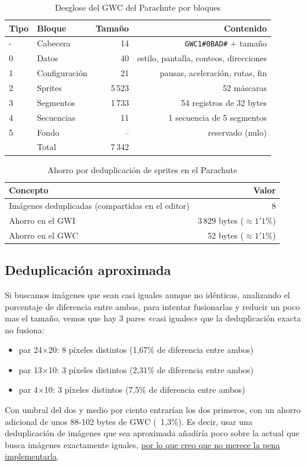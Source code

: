 \begin{table}[H]
	\centering
	\begin{tabular}{llrr}
		\toprule
		Tipo & Bloque & Tamaño & Contenido \\
		\midrule
		- & Cabecera & 14 & \texttt{GWC1\#0BAD\#} + tamaño \\
		0 & Datos & 40 & estilo, pantalla, conteos, direcciones \\
		1 & Configuración & 21 & pausas, aceleración, rutas, fin \\
		2 & Sprites & 5\,523 & 52 máscaras \\
		3 & Segmentos & 1\,733 & 54 registros de 32 bytes \\
		4 & Secuencias & 11 & 1 secuencia de 5 segmentos \\
		5 & Fondo & -- & reservado (nulo) \\
		\midrule
		&Total & 7\,342 & \\
		\bottomrule
	\end{tabular}
	\caption{Desglose del GWC del Parachute por bloques}
	\label{tab:F5I7BloquesParachute}
\end{table}

\begin{table}[H]
	\centering
	\begin{tabular}{lr}
		\toprule
		Concepto & Valor \\
		\midrule
		Imágenes deduplicadas (compartidas en el editor) & 8 \\
		Ahorro en el GWI & 3\,829 bytes ($\approx 1'1\%$) \\
		Ahorro en el GWC & 52 bytes ($\approx 1'1\%$) \\
		\bottomrule
	\end{tabular}
	\caption{Ahorro por deduplicación de sprites en el Parachute}
	\label{tab:F5I7DedupParachute}
\end{table}

\subsection{Deduplicación aproximada}
\label{sec:F5I6Tabla♠Estadistica}


Si buscamos imágenes que sean casi iguales aunque no idénticas, analizando el porcentaje de diferencia entre ambas, para intentar fusionarlas y reducir un poco mas el tamaño, vemos que hay 3 pares «casi iguales» que la deduplicación exacta no fusiona:

\begin{itemize}
	\item par 24×20: 8 píxeles distintos (1,67\% de diferencia entre ambos)
	\item par 13×10: 3 píxeles distintos (2,31\% de diferencia entre ambos) 
	\item par 4×10: 3 píxeles distintos (7,5\% de diferencia entre ambos)
\end{itemize}

Con umbral del dos y medio por ciento entrarían los dos primeros, con un ahorro adicional de unos 88-102 bytes de GWC (~1,3\%). Es decir, usar una deduplicación de imágenes que sea aproximada añadiría poco sobre la actual que busca imágenes exactamente iguales, \underline{por lo que creo que no merece la pena implementarla}.
